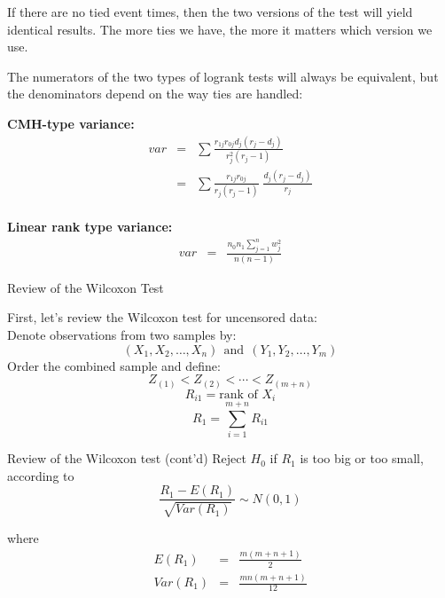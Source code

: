\documentclass[envcountsect, 10pt, portrait, palatino]{beamer}
\begin{document}
\begin{frame}
If there are no tied event times, then the two versions of the
test will yield identical results.  The more ties we have, the
more it matters which version we use.

The numerators of the two types
of logrank tests will always be equivalent, but the denominators
depend on the way ties are handled:

{\bf CMH-type variance:}
\begin{eqnarray*}
var & = & \sum \frac{r_{1j} r_{0j} d_j (r_j-d_j)}{r_j^2(r_j-1)}\\
    & = & \sum \frac{r_{1j} r_{0j}}{r_j (r_j-1)} \; \frac{d_j (r_j-d_j)}{r_j}\\
\end{eqnarray*}

{\bf Linear rank type variance:}
\begin{eqnarray*}
var & = & \frac{n_0 n_1 \sum_{j=1}^{n} w_j^2 }{n(n-1)}
\end{eqnarray*}
\end{frame}

\begin{frame}{Review of the Wilcoxon Test}

First, let's review the Wilcoxon test for uncensored data:\\[1ex]
Denote observations from two samples by:
$$(X_1,X_2, \ldots, X_n) ~~\mbox{and}~~ (Y_1,Y_2,\ldots,Y_m)$$
Order the combined sample and define:
\[Z_{(1)}<Z_{(2)}<\cdots<Z_{(m+n)}\]
\[R_{i1}=\mbox{rank of }X_i\]
\[R_1=\sum_{i=1}^{m+n} R_{i1}\]
\end{frame}
\begin{frame}{Review of the Wilcoxon test (cont'd)}
Reject $H_0$ if $R_1$ is too big or too small, according to
\[\frac{R_1-E(R_1)}{\sqrt{Var(R_1)}}\sim N(0,1)\]

where
\begin{eqnarray*}
E(R_1) & = & \frac{m(m+n+1)}{2}\\[1ex]
Var(R_1) & = & \frac{mn(m+n+1)}{12}
\end{eqnarray*}
\end{frame}
\end{document}
